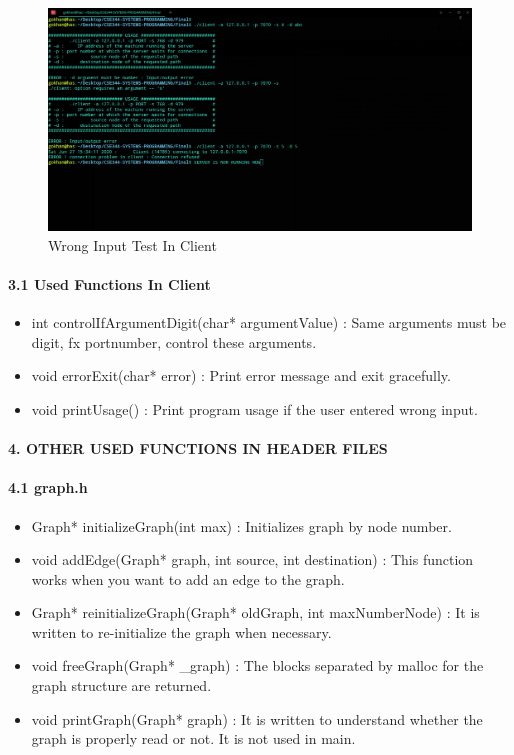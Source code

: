 \documentclass[a4paper,12pt]{report}
\begin{document}
\begin{figure}[h!]
\centering
\includegraphics[scale=0.25]{5_client.png}
\caption{Wrong Input Test In Client}
\label{fig:compile}
\end{figure}

\paragraph{3.1 Used Functions In Client\newline}
\begin{itemize}
    \item int controlIfArgumentDigit(char* argumentValue) : Same arguments must be digit, fx portnumber, control these arguments.
    \item void errorExit(char* error) : Print error message and exit gracefully.
    \item void printUsage() : Print program usage if the user entered wrong input.
\end{itemize}

\newpage
\paragraph{4. OTHER USED FUNCTIONS IN HEADER FILES\newline}
\paragraph{4.1 graph.h\newline}
\begin{itemize}
    \item Graph* initializeGraph(int max) : Initializes graph by node number.
    \item void addEdge(Graph* graph, int source, int destination) : This function works when you want to add an edge to the graph.
    \item Graph* reinitializeGraph(Graph* oldGraph, int maxNumberNode) : It is written to re-initialize the graph when necessary.
    \item void freeGraph(Graph* \_graph) : The blocks separated by malloc for the graph structure are returned.
    \item void printGraph(Graph* graph) : It is written to understand whether the graph is properly read or not. It is not used in main.
\end{itemize}
\end{document}
